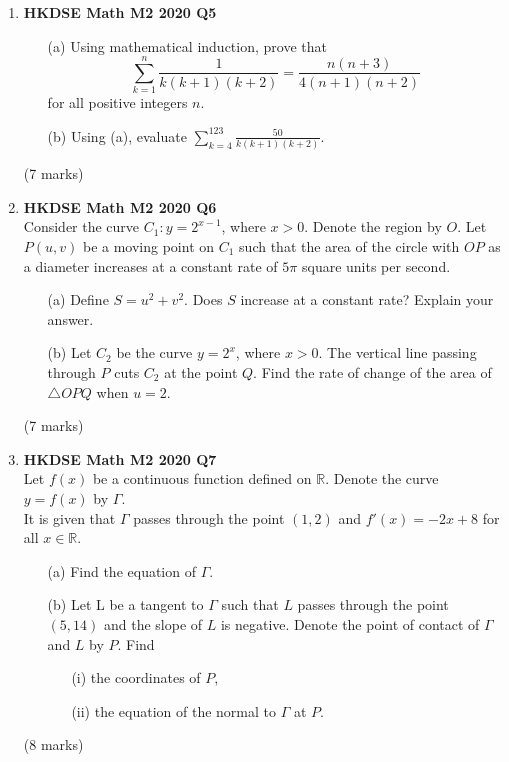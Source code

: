 \documentclass{report}
\begin{document}
\begin{enumerate}
	\item \textbf{HKDSE Math M2 2020 Q5}
	\begin{enumerate}
		\item [(a)]Using mathematical induction, prove that $$\displaystyle \sum_{k = 1}^{n} \frac{1}{k(k+1)(k+2)} = \frac{n(n+3)}{4(n+1)(n+2)}$$ for all positive integers $n$.
		\item [(b)] Using (a), evaluate $\displaystyle \sum_{k = 4}^{123} \frac{50}{k(k+1)(k+2)}$.
	\end{enumerate}
	(7 marks)

	\newpage

	\item \textbf{HKDSE Math M2 2020 Q6}\\
	Consider the curve $C_1 : y = 2^{x-1}$, where $x>0$. Denote the region by $O$. Let $P(u,v)$ be a moving point on $C_1$ such that the area of the circle with $OP$ as a diameter increases at a constant rate of $5\pi$ square units per second.
	\begin{enumerate}
		\item[(a)]
		Define $S = u^2 + v^2$. Does $S$ increase at a constant rate? Explain your answer. 
		\item[(b)]
		Let $C_2$ be the curve $y = 2^x$, where $x>0$. The vertical line passing through $P$ cuts $C_2$ at the point $Q$. Find the rate of change of the area of $\triangle OPQ$ when $u=2$.
	\end{enumerate}
	(7 marks)

	\item \textbf{HKDSE Math M2 2020 Q7}\\
	Let $f(x)$ be a continuous function defined on $\mathbb{R}$. Denote the curve $y = f(x)$ by $\Gamma$. \\
	It is given that $\Gamma $ passes through the point $(1,2)$ and $f'(x) = -2x+8$ for all $x \in \mathbb{R}$. 
	\begin{enumerate}
		\item [(a)]Find the equation of $\Gamma$. 
		\item [(b)]Let L be a tangent to $\Gamma$ such that $L$ passes through the point $(5,14)$ and the slope of $L$ is negative. Denote the point of contact of $\Gamma$ and $L$ by $P$. Find 
		\begin{enumerate}
			\item [(i)]the coordinates of $P$, 
			\item [(ii)]the equation of the normal to $\Gamma $ at $P$.
		\end{enumerate}
	\end{enumerate}
	(8 marks)


\end{enumerate}
\end{document}
